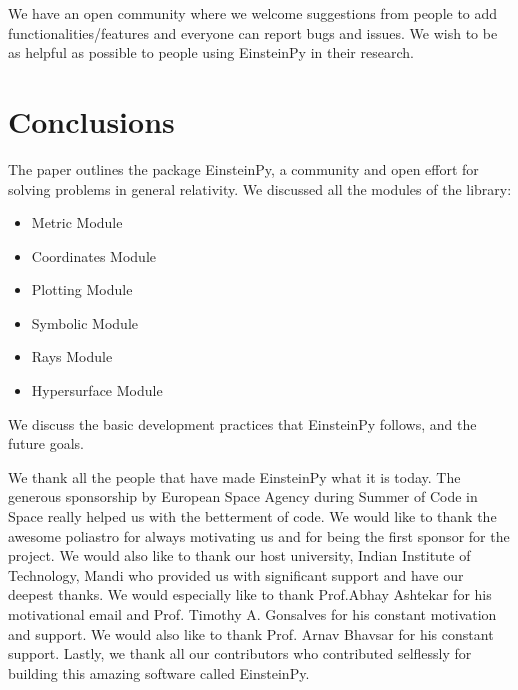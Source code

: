 \documentclass[onecolumn]{aa}
\begin{document}
We have an open community where we welcome suggestions from people to add functionalities/features and everyone can report bugs and issues. We wish to be as helpful as possible to people using EinsteinPy in their research.


\section{Conclusions}
The paper outlines the package EinsteinPy, a community and open effort for solving problems in general relativity. We discussed all the modules of the library:
\begin{itemize}
\item Metric Module
\item Coordinates Module
\item Plotting Module
\item Symbolic Module
\item Rays Module
\item Hypersurface Module
\end{itemize}

We discuss the basic development practices that EinsteinPy follows, and the future goals.



\begin{acknowledgements}
      We thank all the people that have made EinsteinPy what it is today.  
The generous sponsorship by European Space Agency during Summer of Code in Space really helped us with the betterment of code. We would like to thank the awesome poliastro \citep{juan_luis_cano_rodriguez_2019_3588160} for always motivating us and for being the first sponsor for the project. We would also like to thank our host university, Indian Institute of Technology, Mandi who provided us with significant support and have our deepest thanks.
We would especially like to thank Prof.Abhay Ashtekar for his motivational email and  Prof. Timothy A. Gonsalves for his constant motivation and support. We would also like to thank Prof. Arnav Bhavsar for his constant support.
Lastly, we thank all our contributors who contributed selflessly for building this amazing software called EinsteinPy.
      
\end{acknowledgements}

%
%





\end{document}
